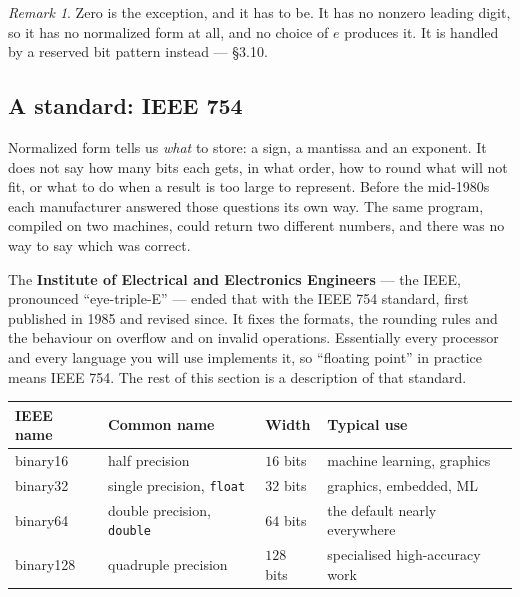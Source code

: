 \documentclass[11pt]{article}
\theoremstyle{plain}
\theoremstyle{definition}
\theoremstyle{remark}
\newtheorem*{rmk}{Remark}
\begin{document}
\begin{rmk}
Zero is the exception, and it has to be. It has no nonzero leading digit, so it
has no normalized form at all, and no choice of $e$ produces it. It is handled
by a reserved bit pattern instead --- \S3.10.
\end{rmk}

\subsection{A standard: IEEE 754}
Normalized form tells us \emph{what} to store: a sign, a mantissa and an
exponent. It does not say how many bits each gets, in what order, how to round
what will not fit, or what to do when a result is too large to represent. Before
the mid-1980s each manufacturer answered those questions its own way. The same
program, compiled on two machines, could return two different numbers, and there
was no way to say which was correct.

The \textbf{Institute of Electrical and Electronics Engineers} --- the IEEE,
pronounced ``eye-triple-E'' --- ended that with the IEEE 754 standard, first
published in 1985 and revised since. It fixes the formats, the rounding rules
and the behaviour on overflow and on invalid operations. Essentially every
processor and every language you will use implements it, so ``floating point''
in practice means IEEE 754. The rest of this section is a description of that
standard.

\begin{center}
\renewcommand{\arraystretch}{1.3}
\begin{tabular}{@{}l l l l@{}}
\toprule
\textbf{IEEE name} & \textbf{Common name} & \textbf{Width} & \textbf{Typical use} \\
\midrule
binary16  & half precision   & $16$ bits  & machine learning, graphics \\
binary32  & single precision, \texttt{float}  & $32$ bits  & graphics, embedded, ML \\
binary64  & double precision, \texttt{double} & $64$ bits  & the default nearly everywhere \\
binary128 & quadruple precision & $128$ bits & specialised high-accuracy work \\
\bottomrule
\end{tabular}
\end{center}
\end{document}
